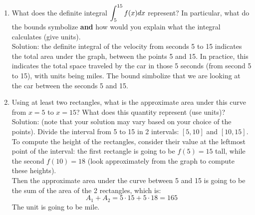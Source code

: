 \documentclass[10pt]{article}
\begin{document}
\begin{enumerate}
    \begin{enumerate}
    \item What does the definite integral $\displaystyle \int_5^{15} f(x) dx$ represent? In particular, what do the bounds symbolize \textbf{ and } how would you explain what the integral calculates (give units).\\    
    Solution: the definite integral of the velocity from seconds 5 to 15 indicates the total area under the graph, between the points 5 and 15. In practice, this indicates the total space traveled by the car in those 5 seconds (from second 5 to 15), with units being miles. The bound simbolize that we are looking at the car between the seconds 5 and 15. 
    \item Using at least two rectangles, what is the approximate area under this curve from $x = 5$ to $x=15$? What does this quantity represent (use units)?\\
    Solution: (note that your solution may vary based on your choice of the points). Divide the interval from 5 to 15 in 2 intervals: $[5,10]$ and $[10,15]$. To compute the height of the rectangles, consider their value at the leftmost point of the interval: the first rectangle is going to be $f(5)=15$ tall, while the second $f(10)=18$ (look approximately from the graph to compute these heights).
    \\ Then the approximate area under the curve between 5 and 15 is going to be the sum of the area of the 2 rectangles, which is:
    \[
    A_1+A_2=5 \cdot 15+5 \cdot 18=165
    \]
    The unit is going to be mile.
        \vfill

    \end{enumerate}


\end{enumerate}
\end{document}
